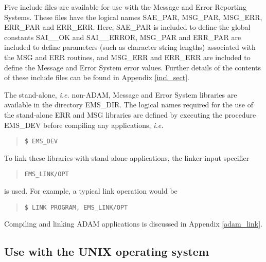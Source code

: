 Five include files are available for use with the Message and Error Reporting 
Systems.
These files have the logical names SAE\_PAR, MSG\_PAR, MSG\_ERR, ERR\_PAR and 
ERR\_ERR.
Here, SAE\_PAR is included to define the global constants SAI\_\_OK and
SAI\_\_ERROR, MSG\_PAR and ERR\_PAR are included to define parameters (such 
as  character string lengths) associated with the MSG and ERR routines,
and MSG\_ERR and ERR\_ERR are included to define the Message and Error System
error values.
Further details of the contents of these include files can be found in Appendix
\ref {incl_sect}.

The stand-alone, {\em i.e.} non-ADAM, Message and Error System libraries are
available in the directory EMS\_DIR.
The logical names  required for the use of the stand-alone ERR and MSG
libraries are  defined by executing the procedure EMS\_DEV
before compiling any applications, {\em i.e.}

\begin {quote}
\begin {small}
\begin{verbatim}
$ EMS_DEV
\end{verbatim}
\end {small}
\end {quote}

To link these libraries with stand-alone applications, the linker input 
specifier

\begin {quote}
\begin {small}
\begin{verbatim}
EMS_LINK/OPT
\end{verbatim}
\end {small}
\end {quote}

is used. 
For example, a typical link operation would be

\begin {quote}
\begin {small}
\begin{verbatim}
$ LINK PROGRAM, EMS_LINK/OPT
\end{verbatim}
\end {small}
\end {quote}

Compiling and linking ADAM applications is discussed in Appendix
\ref{adam_link}.


\subsection {Use with the UNIX operating system}

